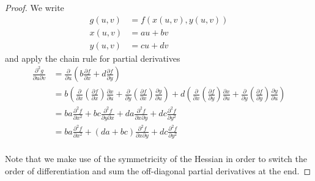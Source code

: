 \documentclass[letterpaper,11pt]{article}
\newcommand{\parens}[1]{\left(#1\right)}
\begin{document}
\begin{enumerate}
\begin{enumerate}
                \begin{proof}
                    We write
                    \begin{align*}
                        g(u, v) &= f(x(u, v), y(u, v)) \\
                        x(u, v) &= au + bv \\
                        y(u, v) &= cu + dv
                    \end{align*}
                    and apply the chain rule for partial derivatives
                    \begin{align*}
                        \frac{\partial^2 g}{\partial u \partial v}
                        &= \frac{\partial}{\partial u} \parens {
                            b \frac{\partial f}{\partial x}
                            +
                            d \frac{\partial f}{\partial y}
                        } \\
                        &= b \parens{
                            \frac{\partial}{\partial x} \parens{
                                \frac{\partial f}{\partial x}
                            }
                            \frac{\partial x}{\partial u}
                            +
                            \frac{\partial}{\partial y} \parens{
                                \frac{\partial f}{\partial x}
                            }
                            \frac{\partial y}{\partial u}
                        }
                        + d \parens {
                            \frac{\partial}{\partial x} \parens{
                                \frac{\partial f}{\partial y}
                            }
                            \frac{\partial x}{\partial u}
                            +
                            \frac{\partial}{\partial y} \parens{
                                \frac{\partial f}{\partial y}
                            }
                            \frac{\partial y}{\partial u}
                        } \\
                        &=
                        b a \frac{\partial^2 f}{\partial x^2}
                        +
                        b c \frac{\partial^2 f}{\partial y \partial x}
                        +
                        d a \frac{\partial^2 f}{\partial x \partial y}
                        +
                        d c \frac{\partial^2 f}{\partial y^2} \\
                        &=
                        b a \frac{\partial^2 f}{\partial x^2}
                        +
                        (d a + b c) \frac{\partial^2 f}{\partial x \partial y}
                        +
                        d c \frac{\partial^2 f}{\partial y^2} \\
                    \end{align*}

                    Note that we make use of the symmetricity of the Hessian in
                    order to switch the order of differentiation and sum the
                    off-diagonal partial derivatives at the end.
                \end{proof}
        \end{enumerate}
\end{enumerate}
\end{document}
